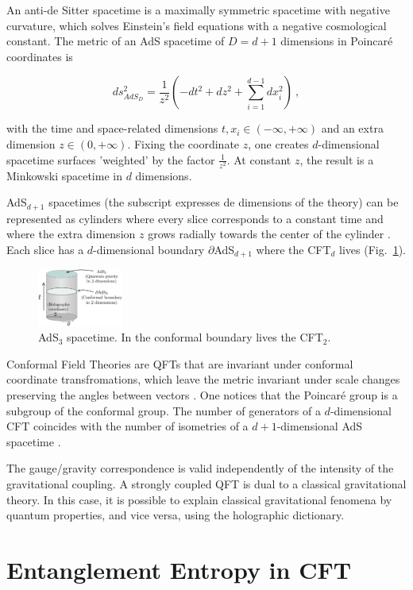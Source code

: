 \documentclass[twocolumn]{revtex4}
\providecommand{\eq}[2]{
    \begin{equation}
        #2
    \label{eq:#1}
    \end{equation}
}
\begin{document}
An anti-de Sitter spacetime is a maximally symmetric spacetime with negative curvature, which solves Einstein's field equations with a negative cosmological constant. The metric of an AdS spacetime of $D=d+1$ dimensions in Poincaré coordinates is
\eq{AdS_PP-metric}{
    ds_{AdS_D}^2 = \frac{1}{z^2} \left( -dt^2 + dz^2 + \sum_{i=1}^{d-1} dx_i^2 \right) \ ,
}
\cite{kaplan_lectures_nodate} with the time and space-related dimensions $t , x_i \in (-\infty,+\infty)$ and an extra dimension $z \in (0,+\infty)$. Fixing the coordinate $z$, one creates $d$-dimensional spacetime surfaces 'weighted' by the factor $\frac{1}{z^2}$. At constant $z$, the result is a Minkowski spacetime in $d$ dimensions.

AdS$_{d+1}$ spacetimes (the subscript expresses de dimensions of the theory) can be represented as cylinders where every slice corresponds to a constant time and where the extra dimension $z$ grows radially towards the center of the cylinder \cite{}. Each slice has a $d$-dimensional boundary $\partial$AdS$_{d+1}$ where the CFT$_d$ lives (Fig.~\ref{fig:AdS}).

\begin{figure}
    \centering
    \includegraphics[width=0.25\textwidth]{../Imatges/AdS_Cylindric.png}
\caption{AdS$_3$ spacetime. In the conformal boundary lives the CFT$_2$.}
\label{fig:AdS}
\end{figure}

Conformal Field Theories are QFTs that are invariant under conformal coordinate transfromations, which leave the metric invariant under scale changes preserving the angles between vectors \cite{ginsparg_applied_1988}. One notices that the Poincaré group is a subgroup of the conformal group. The number of generators of a $d$-dimensional CFT coincides with the number of isometries of a $d+1$-dimensional AdS spacetime \cite{}.

The gauge/gravity correspondence is valid independently of the intensity of the gravitational coupling. A strongly coupled QFT is dual to a classical gravitational theory. In this case, it is possible to explain classical gravitational fenomena by quantum properties, and vice versa, using the holographic dictionary.


\section{Entanglement Entropy in CFT} \label{s:EE_CFT}
\end{document}
